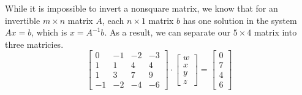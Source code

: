 \documentclass[11pt, letterpaper, twoside]{article}
\begin{document}
\begin{enumerate}
\begin{enumerate}[label=(\alph*)]
While it is impossible to invert a nonsquare matrix, we know that for an invertible $m\times n$ matrix $A$, each $n\times1$ matrix $b$ has one solution in the system $Ax=b$, which is $x=A^{-1}b$. As a result, we can separate our $5\times4$ matrix into three matricies.
$$ \begin{bmatrix}
0 & -1 & -2 & -3\\
1 & 1 & 4 & 4\\
1 & 3 & 7 & 9\\
-1 & -2 & -4 & -6
\end{bmatrix}\cdot \begin{bmatrix}
w \\
x \\
y \\
z
\end{bmatrix}=\begin{bmatrix}
0 \\
7 \\
4 \\
6
\end{bmatrix}$$


\end{enumerate}
\end{enumerate}
\end{document}
